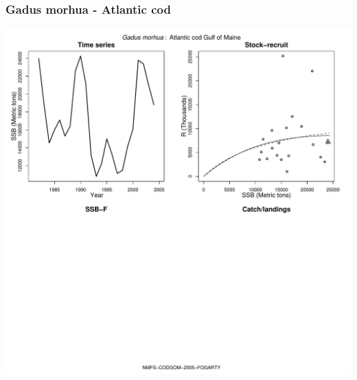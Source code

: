 \subsubsection{Gadus morhua - Atlantic cod}
\begin{center}
\includegraphics[width=1.2\textwidth]{../R/figures/NMFS-CODGOM-2005-FOGARTY.pdf}
\end{center}

